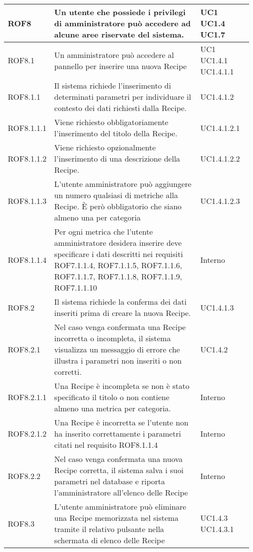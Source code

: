 \begin{center}
\begin{longtable}{| p{2.5cm} | p{8cm} | p{2cm} |}
		ROF8  &  Un utente che possiede i privilegi di amministratore può accedere ad alcune aree riservate del sistema.  &  UC1 \newline UC1.4 \newline UC1.7 \\
		\hline
		ROF8.1  &  Un amministratore può accedere al pannello per inserire una nuova Recipe  & UC1 \newline UC1.4.1 \newline UC1.4.1.1 \\
		\hline
		ROF8.1.1  &  Il sistema richiede l'inserimento di determinati parametri per individuare il contesto dei dati richiesti dalla Recipe.  &  UC1.4.1.2 \\
		\hline
		ROF8.1.1.1  &  Viene richiesto obbligatoriamente l'inserimento del titolo della Recipe.  &  UC1.4.1.2.1 \\
		\hline
		ROF8.1.1.2  &  Viene richiesto opzionalmente l'inserimento di una descrizione della Recipe.  &  UC1.4.1.2.2 \\
		\hline
		ROF8.1.1.3  &  L'utente amministratore può aggiungere un numero qualsiasi di metriche alla Recipe. È però obbligatorio che siano almeno una per categoria  &  UC1.4.1.2.3 \\
		\hline
		ROF8.1.1.4  &  Per ogni metrica che l'utente amministratore desidera inserire deve specificare i dati descritti nei requisiti ROF7.1.1.4, ROF7.1.1.5, ROF7.1.1.6, ROF7.1.1.7, ROF7.1.1.8, ROF7.1.1.9, ROF7.1.1.10  &  Interno \\
		\hline
		ROF8.2  &  Il sistema richiede la conferma dei dati inseriti prima di creare la nuova Recipe.  &  UC1.4.1.3 \\
		\hline
		ROF8.2.1  &  Nel caso venga confermata una Recipe incorretta o incompleta, il sistema visualizza un messaggio di errore che illustra i parametri non inseriti o non corretti. &  UC1.4.2 \\
		\hline
		ROF8.2.1.1  &  Una Recipe è incompleta se non è stato specificato il titolo o non contiene almeno una metrica per categoria. &  Interno \\
		\hline
		ROF8.2.1.2  &  Una Recipe è incorretta se l'utente non ha inserito correttamente i parametri citati nel requisito ROF8.1.1.4 &  Interno \\
		\hline
		ROF8.2.2  &  Nel caso venga confermata  una nuova Recipe corretta, il sistema salva i suoi parametri nel database e riporta l'amministratore all'elenco delle Recipe  &  Interno \\
		\hline
		ROF8.3  &  L'utente amministratore può eliminare una Recipe memorizzata nel sistema tramite il relativo pulsante nella schermata di elenco delle Recipe  &  UC1.4.3 \newline UC1.4.3.1  \\

\end{longtable}
\end{center}
